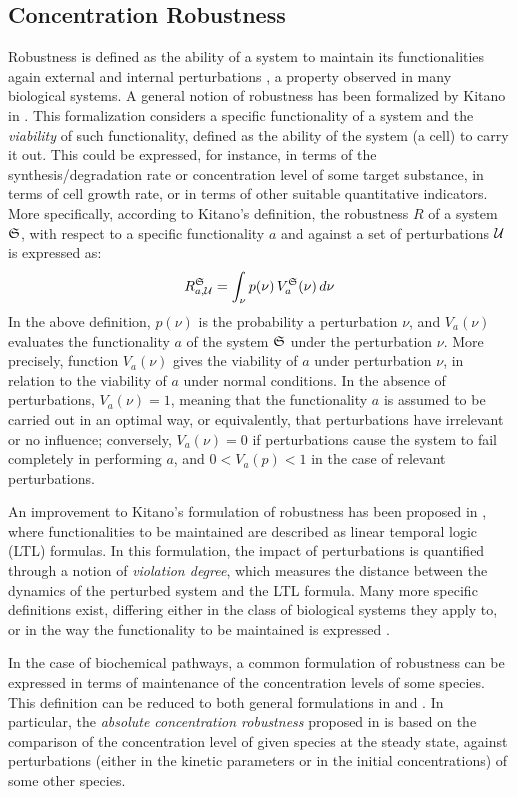 \subsection{Concentration Robustness}\label{sec:robustness}
Robustness is defined as the ability of a system to maintain its functionalities again external and internal perturbations \citep{kitano2004biological}, a property observed in many biological systems. A general notion of robustness has been formalized by Kitano in \cite{kitano2007towards}. This formalization considers a specific functionality of a system and the \emph{viability} of such functionality, defined as the ability of the system (\eg a cell) to carry it out. This could be expressed, for instance, in terms of the synthesis/degradation rate or concentration level of some target substance, in terms of cell growth rate, or in terms of  other suitable quantitative indicators. More specifically, according to Kitano's definition, the robustness $R$ of a system $\mathfrak{S}$, with respect to a specific functionality $a$ and against a set of perturbations $\Cal{U}$ is expressed as:
\[
 R^{\System}_{a,\Cal{U}} = \int_{\nu} p(\nu)\, V_a^{\System}(\nu)\,d\nu
\]
In the above definition, $p(\nu)$ is the probability a perturbation $\nu$, and $V_a(\nu)$ evaluates the functionality $a$ of the system $\mathfrak{S}$ under the perturbation $\nu$. More precisely, function $V_a(\nu)$ gives the viability of $a$ under perturbation $\nu$, in relation to the viability of $a$ under normal conditions. In the absence of perturbations, $V_a(\nu)=1$, meaning that the functionality $a$ is assumed to be carried out in an optimal way, or equivalently, that perturbations have irrelevant or no influence; conversely, $V_a(\nu) = 0$ if perturbations cause the system to fail completely in performing $a$, and $0 < V_a(p) < 1$ in the case of relevant perturbations.

An improvement to Kitano's formulation of robustness has been proposed in \citep{rizk2009general}, where functionalities to be maintained are described as linear temporal logic (LTL) formulas. In this formulation, the impact of perturbations is quantified through a notion of \emph{violation degree}, which measures the distance between the dynamics of the perturbed system and the LTL formula. Many more specific definitions exist, differing either in the class of biological systems they apply to, or in the way the functionality to be maintained is expressed \citep{larhlimi2011robustness}.

In the case of biochemical pathways, a common formulation of robustness can be expressed in terms of maintenance of the concentration levels of some species. This definition can be reduced to both general formulations in \citep{kitano2007towards} and \cite{rizk2009general}. In particular, the \emph{absolute concentration robustness} proposed in \cite{shinar2010structural} is based on the comparison of the concentration level of given species at the steady state, against perturbations (either in the kinetic parameters or in the initial concentrations) of some other species.

